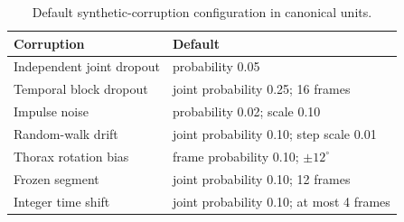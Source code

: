 \begin{table}[t]
\centering
\caption{Default synthetic-corruption configuration in canonical units.}
\label{tab:corruptions}
\small
\begin{tabular}{l l}
\toprule
Corruption & Default \\
\midrule
Independent joint dropout & probability 0.05 \\
Temporal block dropout & joint probability 0.25; 16 frames \\
Impulse noise & probability 0.02; scale 0.10 \\
Random-walk drift & joint probability 0.10; step scale 0.01 \\
Thorax rotation bias & frame probability 0.10; $\pm12^{\circ}$ \\
Frozen segment & joint probability 0.10; 12 frames \\
Integer time shift & joint probability 0.10; at most 4 frames \\
\bottomrule
\end{tabular}
\end{table}
